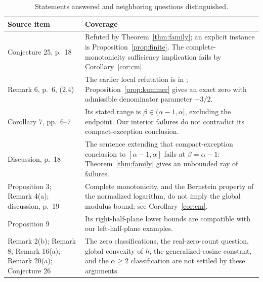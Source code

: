 \documentclass[11pt]{article}
\begin{document}
\begin{table}[ht]
\centering\small
\begin{tabular}{@{}p{}p{}@{}}
\toprule
Source item & Coverage \\
\midrule
Conjecture 25, p.~18 & Refuted by Theorem~\ref{thm:family}; an explicit
instance is Proposition~\ref{prop:finite}. The complete-monotonicity
sufficiency implication fails by Corollary~\ref{cor:cm}. \\
Remark 6, p.~6, (2.4) & The earlier local refutation is in
\cite{kummer-prior}; Proposition~\ref{prop:kummer} gives an exact zero
with admissible denominator parameter $-3/2$. \\
Corollary 7, pp.~6--7 & Its stated range is
$\beta\in(\alpha-1,\alpha]$, excluding the endpoint.
Our interior failures do not contradict its compact-exception conclusion. \\
Discussion, p.~18 & The sentence extending that compact-exception
conclusion to $[\alpha-1,\alpha]$ fails at $\beta=\alpha-1$:
Theorem~\ref{thm:family} gives an unbounded ray of failures. \\
Proposition 3; Remark 4(a); discussion, p.~19 & Complete monotonicity,
and the Bernstein property of the normalized logarithm, do not imply
the global modulus bound; see Corollary~\ref{cor:cm}. \\
Proposition 9 & Its right-half-plane
lower bounds are compatible with our left-half-plane examples. \\
Remark 2(b); Remark 8; Remark 16(a); Remark 20(a); Conjecture 26
& The zero classifications, the real-zero-count question, global convexity
of $h$, the generalized-cosine constant, and the $\alpha\ge2$
classification are not settled by these arguments. \\
\bottomrule
\end{tabular}
\caption{Statements answered and neighboring questions distinguished.}
\label{tab:coverage}
\end{table}
\end{document}
